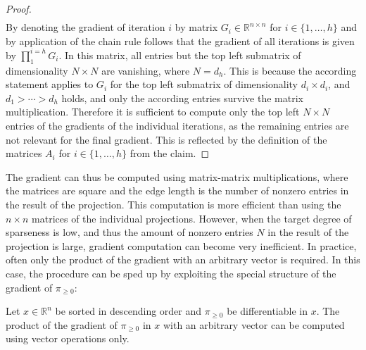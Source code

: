 \documentclass[twoside,11pt]{article}
\newcommand{\R}{\mathbb{R}}
\newcommand{\0}{\mathcal{O}}
\newcommand{\discint}[2]{\{#1,\dotsc,#2\}}
\newcommand{\inint}[2]{\in\discint{#1}{#2}}
\begin{document}
\begin{proof}
\begin{align*}
\end{align*}
By denoting the gradient of iteration $i$ by matrix $G_i\in\R^{n\times n}$ for $i\inint{1}{h}$ and by application of the chain rule follows that the gradient of all iterations is given by $\prod^{i=h}_1 G_i$.
In this matrix, all entries but the top left submatrix of dimensionality $N \times N$ are vanishing, where $N = d_h$.
This is because the according statement applies to $G_i$ for the top left submatrix of dimensionality $d_i\times d_i$, and $d_1 > \cdots > d_h$ holds, and only the according entries survive the matrix multiplication.
Therefore it is sufficient to compute only the top left $N\times N$ entries of the gradients of the individual iterations, as the remaining entries are not relevant for the final gradient.
This is reflected by the definition of the matrices $A_i$ for $i\inint{1}{h}$ from the claim.
\end{proof}
The gradient can thus be computed using matrix-matrix multiplications, where the matrices are square and the edge length is the number of nonzero entries in the result of the projection.
This computation is more efficient than using the $n\times n$ matrices of the individual projections.
However, when the target degree of sparseness is low, and thus the amount of nonzero entries $N$ in the result of the projection is large, gradient computation can become very inefficient.
In practice, often only the product of the gradient with an arbitrary vector is required.
In this case, the procedure can be sped up by exploiting the special structure of the gradient of $\pi_{\geq 0}$:
\begin{corollary}
\label{cor:projfuncgraddgemv}
Let $x\in\R^n$ be sorted in descending order and $\pi_{\geq 0}$ be differentiable in $x$.
The product of the gradient of $\pi_{\geq 0}$ in $x$ with an arbitrary vector can be computed using vector operations only.
\end{corollary}
\end{document}
